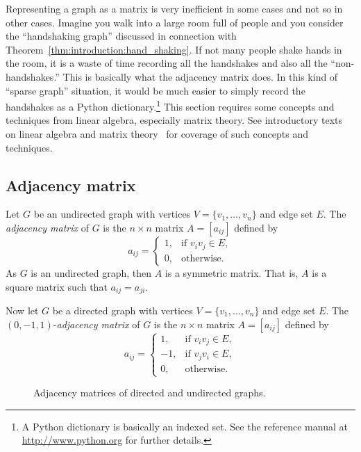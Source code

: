 Representing a graph as a matrix is very inefficient in some cases and
not so in other cases. Imagine you walk into a large room full of
people and you consider the ``handshaking graph'' discussed in
connection with Theorem~\ref{thm:introduction:hand_shaking}. If not
many people shake hands in the room, it is a waste of time recording
all the handshakes and also all the ``non-handshakes.'' This is
basically what the adjacency matrix does. In this kind of
``sparse graph'' situation, it would be much
easier to simply record the handshakes as a Python
dictionary.\footnote{
  A Python dictionary is basically an indexed set. See
  the reference manual at \url{http://www.python.org} for further
  details.
}
This section requires some concepts and techniques from linear
algebra, especially matrix theory. See introductory texts on linear
algebra and matrix theory~\cite{Beezer2009} for coverage of such
concepts and techniques.



\subsection{Adjacency matrix}

Let $G$ be an undirected graph with vertices
$V = \{ v_1, \dots, v_n \}$ and edge set $E$. The
\emph{adjacency matrix} of $G$ is the $n \times n$ matrix
$A = [a_{ij}]$ defined by
\[
a_{ij}
=
\begin{cases}
1, & \text{if $v_i v_j \in E$}, \\
0, & \text{otherwise}.
\end{cases}
\]
As $G$ is an undirected graph, then $A$ is a symmetric matrix. That
is, $A$ is a square matrix such that $a_{ij} = a_{ji}$.

Now let $G$ be a directed graph with vertices
$V = \{ v_1, \dots, v_n \}$ and edge set $E$. The
$(0, -1, 1)$-\emph{adjacency matrix} of $G$ is
the $n \times n$ matrix $A = [a_{ij}]$ defined by
\[
a_{ij}
=
\begin{cases}
1,  & \text{if $v_i v_j \in E$}, \\
-1, & \text{if $v_j v_i \in E$}, \\
0,  & \text{otherwise}.
\end{cases}
\]

\begin{figure}[!htbp]
\centering

\caption{Adjacency matrices of directed and undirected graphs.}
\label{fig:introduction:adjacency_matrices}
\end{figure}

